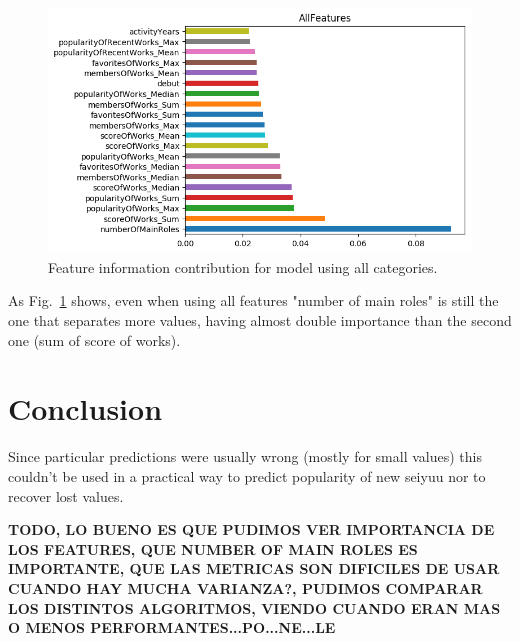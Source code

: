 \begin{figure}[!hbt]
	\centering
	\includegraphics[width=\columnwidth]{graphics/AllFeatures_DTC_featureImportances.png}
	\caption{Feature information contribution for model using all categories.}
	\label{fig:DTC_All}
\end{figure}

As Fig.~\ref{fig:DTC_All} shows, even when using all features "number of main roles" is still the one that separates more values, having almost double importance than the second one (sum of score of works).

\section{Conclusion}

Since particular predictions were usually wrong (mostly for small values) this couldn't be used in a practical way to predict popularity of new seiyuu nor to recover lost values. 

\textbf{TODO, LO BUENO ES QUE PUDIMOS VER IMPORTANCIA DE LOS FEATURES, QUE NUMBER OF MAIN ROLES ES IMPORTANTE, QUE LAS METRICAS SON DIFICILES DE USAR CUANDO HAY MUCHA VARIANZA?, PUDIMOS COMPARAR LOS DISTINTOS ALGORITMOS, VIENDO CUANDO ERAN MAS O MENOS PERFORMANTES...PO...NE...LE}